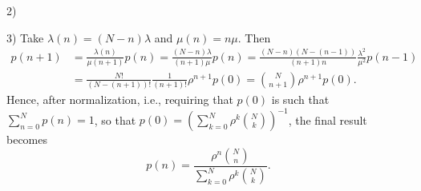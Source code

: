 \begin{question}
\begin{solution}
2) \tbd

3)   Take $\lambda(n) = (N-n)\lambda$ and $\mu(n) = n \mu$. Then 
    \begin{equation*}
      \begin{split}
      p(n+1) 
&= \frac{\lambda(n)}{\mu(n+1)} p(n) 
= \frac{(N-n)\lambda}{(n+1)\mu} p(n) 
= \frac{(N-n)(N-(n-1))}{(n+1)n}\frac{\lambda^2}{\mu^2} p(n-1) \\
&= \frac{N!}{(N-(n+1))!}\frac1{(n+1)!}\rho^{n+1} p(0) 
  = {N \choose n+1}\rho^{n+1} p(0).
      \end{split}
    \end{equation*}
    Hence, after normalization, i.e., requiring that $p(0)$ is such
    that $\sum_{n=0}^N p(n) = 1$, so that $p(0) = \left(\sum_{k=0}^N \rho^k { N \choose k} \right)^{-1}$, the final result becomes
\begin{equation*}
  p(n) = \frac{\rho^n {N \choose n}}{\sum_{k=0}^N \rho^k {N \choose k}}.
\end{equation*}
    \end{solution}
\end{question}


